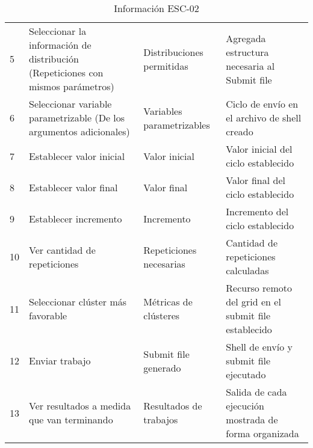 \begin{table}[H]
\begin{tabular}{|p{2cm}|p{4cm}|p{2.5cm}|p{4.7cm}|}
		5                                       & Seleccionar la información de distribución (Repeticiones con mismos parámetros)     & Distribuciones permitidas       & Agregada estructura necesaria al Submit file                        \\
		6                                       & Seleccionar variable parametrizable (De los argumentos adicionales)                 & Variables parametrizables       & Ciclo de envío en el archivo de shell creado                        \\
		7                                       & Establecer valor inicial                                                            & Valor inicial                   & Valor inicial del ciclo establecido                                 \\
		8                                       & Establecer valor final                                                              & Valor final                     & Valor final del ciclo establecido                                   \\
		9                                       & Establecer incremento                                                               & Incremento                      & Incremento del ciclo establecido                                    \\
		10                                      & Ver cantidad de repeticiones                                                        & Repeticiones necesarias         & Cantidad de repeticiones calculadas                                 \\
		11                                      & Seleccionar clúster más favorable                                                   & Métricas de clústeres           & Recurso remoto del grid en el submit file establecido               \\
		12                                      & Enviar trabajo                                                                      & Submit file generado            & Shell de envío y submit file ejecutado                              \\
		13                                      & Ver resultados a medida que van terminando                                          & Resultados de trabajos          & Salida de cada ejecución mostrada de forma organizada               \\
		\hline
	\end{tabular}
	\caption{Información ESC-02}
	\label{table:esc-02}
\end{table}


